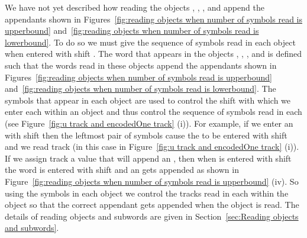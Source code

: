 \documentclass[11pt]{article} \usepackage{amsfonts,amsmath,amssymb,amsthm}
\begin{document}
We have not yet described how reading the objects , , , and  append the appendants shown in Figures~\ref{fig:reading objects when number of symbols read is upperbound} and~\ref{fig:reading objects when number of symbols read is lowerbound}. To do so we must give the sequence of symbols read in each object when entered with shift . 
The word  that appears in the objects , , , and  is defined such that the  words read in these objects append the appendants shown in Figures~\ref{fig:reading objects when number of symbols read is upperbound} and~\ref{fig:reading objects when number of symbols read is lowerbound}. 
The  symbols that appear in each object are used to control the shift with which we enter each  within an object and thus control the sequence of symbols read in each  (see Figure~\ref{fig:u track and encodedOne track} (i)). 
For example, if we enter an  with shift  then the leftmost pair of  symbols cause the  to be entered with shift  and we read track  (in this case  in Figure~\ref{fig:u track and encodedOne track} (i)). 
If we assign track  a value that will append an , then when  is entered with shift  the word  is entered with shift  and an  gets appended as shown in Figure~\ref{fig:reading objects when number of symbols read is upperbound} (iv).
So using the  symbols in each object we control the tracks read in each  within the object so that the correct appendant gets appended when the object is read. The details of reading objects and  subwords are given in Section~\ref{sec:Reading objects and  subwords}.
\end{document}
